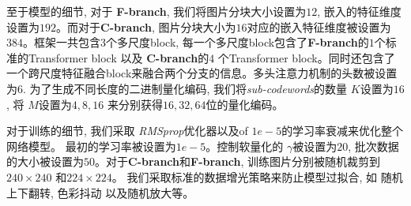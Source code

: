 至于模型的细节, 对于 \textbf{F-branch}, 我们将图片分块大小设置为$12$, 嵌入的特征维度设置为$192$。而对于\textbf{C-branch}, 图片分块大小为$16$对应的嵌入特征维度被设置为$384$。框架一共包含$3$个多尺度block, 每一个多尺度block包含了\textbf{F-branch}的$1$个标准的Transformer block 以及 \textbf{C-branch}的$4$ 个Transformer block。同时还包含了一个跨尺度特征融合block来融合两个分支的信息。多头注意力机制的头数被设置为$6$. 为了生成不同长度的二进制量化编码, 我们将\textit{sub-codewords}的数量 $K$设置为$16$, 将 $M$设置为$4, 8, 16$ 来分别获得$16, 32, 64$位的量化编码。 \par
对于训练的细节, 我们采取 \textit{RMSprop}优化器以及of $1e-5$的学习率衰减来优化整个网络模型。 最初的学习率被设置为$1e-5$。控制软量化的 $\gamma$被设置为$20$, 批次数据的大小被设置为$50$。对于\textbf{C-branch}和\textbf{F-branch}, 训练图片分别被随机裁剪到 $240 \times 240$ 和$224 \times 224$。 我们采取标准的数据增光策略来防止模型过拟合, 如 随机上下翻转, 色彩抖动 以及随机放大等。

